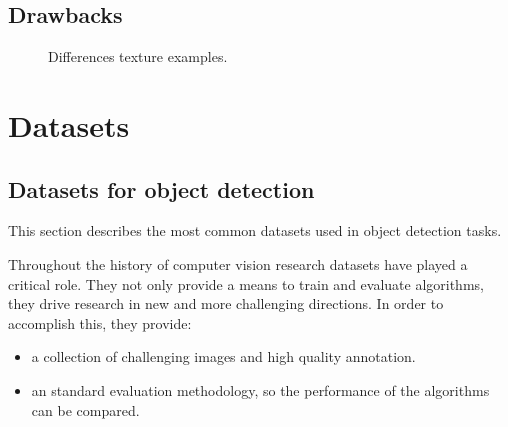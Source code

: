 \documentclass[12pt, a4paper, titlepage,twoside,openright]{article}
\begin{document}
\subsection{Drawbacks}




\begin{figure}[H]
		
\centering

\caption{Differences texture examples.}
\label{Fails1}
\end{figure}




\section{Datasets}



\subsection{Datasets for object detection}

This section describes the most common datasets used in object detection tasks.

Throughout the history of computer vision research datasets have played a critical role.  They not only provide a means to train and evaluate algorithms, they drive research in new and more challenging directions. In order to accomplish this, they provide:


\begin{itemize}

\item a collection of challenging images and high quality annotation.

\item an standard evaluation methodology, so the performance of the algorithms can be compared. 


\end{itemize}
\end{document}

